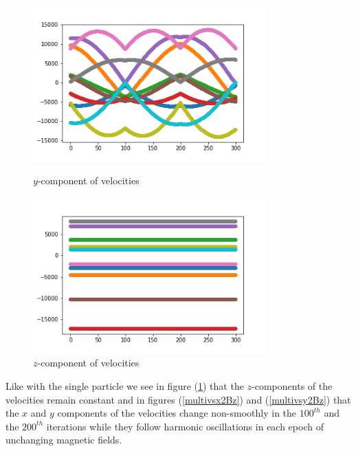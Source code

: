 \documentclass[12pt]{article}
\begin{document}
	\begin{figure}[H]
		\begin{multicols}{2}
			\includegraphics[width=\linewidth, height=6cm]{multivsy2Bz.png} \caption{$y$-component of velocities} \label{multivsy2Bz} \par
			\includegraphics[width=\linewidth, height=6cm]{multivsz2Bz.png} \caption{$z$-component of velocities} \label{multivsz2Bz} \par
		\end{multicols}
	\end{figure}
	\noindent Like with the single particle we see in figure (\ref{multivsz2Bz}) that the $z$-components of the velocities remain constant and in figures (\ref{multivsx2Bz})  and (\ref{multivsy2Bz}) that the $x$ and $y$ components of the velocities change non-smoothly in the $100^{th}$ and the $200^{th}$ iterations while they follow harmonic oscillations in each epoch of unchanging magnetic fields. 
\end{document}
